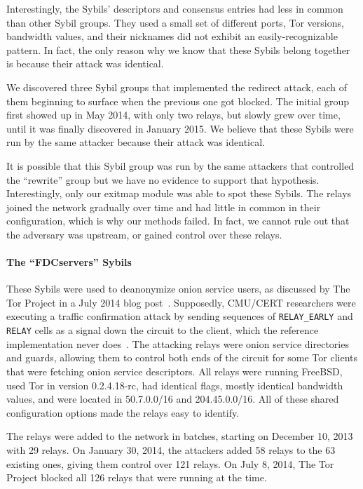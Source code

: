 Interestingly, the Sybils' descriptors and consensus entries had less in common
than other Sybil groups.  They used a small set of different ports, Tor
versions, bandwidth values, and their nicknames did not exhibit an
easily-recognizable pattern.  In fact, the only reason why we know that these
Sybils belong together is because their attack was identical.

We discovered three Sybil groups that implemented the redirect attack, each of
them beginning to surface when the previous one got blocked.  The initial group
first showed up in May 2014, with only two relays, but slowly grew over time,
until it was finally discovered in January 2015.  We believe that these Sybils
were run by the same attacker because their attack was identical.

It is possible that this Sybil group was run by the same attackers that
controlled the ``rewrite'' group but we have no evidence to support that
hypothesis.  Interestingly, only our exitmap module was able to spot these
Sybils.  The relays joined the network gradually over time and had little in
common in their configuration, which is why our \sys methods failed.  In fact,
we cannot rule out that the adversary was upstream, or gained control over these
relays.

\paragraph{The ``FDCservers'' Sybils}
These Sybils were used to deanonymize onion service users, as discussed by The
Tor Project in a July 2014 blog post~\cite{cmucert}.  Supposedly, CMU/CERT
researchers were executing a traffic confirmation attack by sending sequences of
\texttt{RELAY\_EARLY} and \texttt{RELAY} cells as a signal down the circuit to
the client, which the reference implementation never
does~\cite{cmucert,cmucert2}.  The attacking relays were onion service
directories and guards, allowing them to control both ends of the circuit for
some Tor clients that were fetching onion service descriptors.  All relays were
running FreeBSD, used Tor in version 0.2.4.18-rc, had identical flags, mostly
identical bandwidth values, and were located in 50.7.0.0/16 and 204.45.0.0/16.
All of these shared configuration options made the relays easy to identify.

The relays were added to the network in batches, starting on December 10, 2013
with 29 relays.  On January 30, 2014, the attackers added 58 relays to the 63
existing ones, giving them control over 121 relays.  On July 8, 2014, The Tor
Project blocked all 126 relays that were running at the time.

